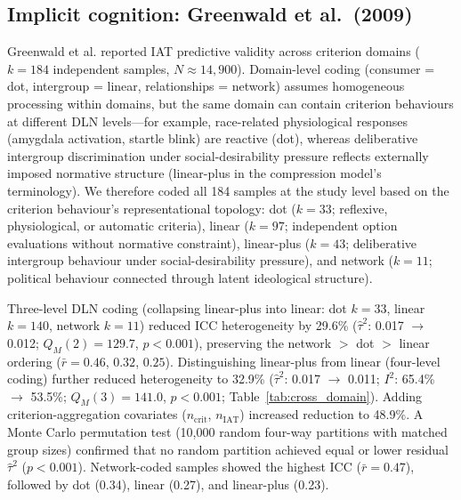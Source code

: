 \documentclass[11pt]{article}
\begin{document}
\subsection{Implicit cognition: Greenwald et al.\ (2009)}

Greenwald et al.\cite{Greenwald2009} reported IAT predictive validity
across criterion domains ($k = 184$ independent samples, $N \approx
14{,}900$). Domain-level coding (consumer = dot, intergroup = linear,
relationships = network) assumes homogeneous processing within domains,
but the same domain can contain criterion behaviours at different DLN
levels---for example, race-related physiological responses (amygdala
activation, startle blink) are reactive (dot), whereas deliberative
intergroup discrimination under social-desirability pressure reflects
externally imposed normative structure (linear-plus in the compression
model's terminology\cite{Wu2026}). We therefore coded all 184 samples
at the study level based on the criterion behaviour's representational
topology: dot ($k = 33$; reflexive, physiological, or automatic
criteria), linear ($k = 97$; independent option evaluations without
normative constraint), linear-plus ($k = 43$; deliberative intergroup
behaviour under social-desirability pressure), and network ($k = 11$;
political behaviour connected through latent ideological structure).

Three-level DLN coding (collapsing linear-plus into linear: dot $k = 33$,
linear $k = 140$, network $k = 11$) reduced ICC heterogeneity by 29.6\%
($\hat\tau^2$: 0.017 $\to$ 0.012; $Q_M(2) = 129.7$, $p < 0.001$),
preserving the network $>$ dot $>$ linear ordering ($\bar{r} = 0.46$,
$0.32$, $0.25$). Distinguishing linear-plus from linear (four-level
coding) further reduced heterogeneity to 32.9\%
($\hat\tau^2$: 0.017 $\to$ 0.011; $I^2$: 65.4\% $\to$ 53.5\%;
$Q_M(3) = 141.0$, $p < 0.001$; Table~\ref{tab:cross_domain}). Adding
criterion-aggregation covariates ($n_\mathrm{crit}$, $n_\mathrm{IAT}$)
increased reduction to 48.9\%.
A Monte Carlo permutation test (10{,}000 random four-way partitions
with matched group sizes) confirmed that no random partition achieved
equal or lower residual $\hat\tau^2$ ($p < 0.001$). Network-coded
samples showed the highest ICC ($\bar{r} = 0.47$), followed by dot
(0.34), linear (0.27), and linear-plus (0.23).
\end{document}
